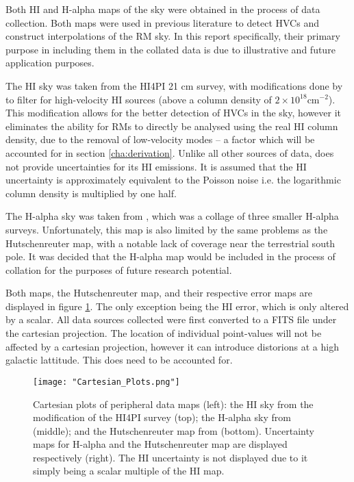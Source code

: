Both HI and H-alpha maps of the sky were obtained in the process of data collection. Both maps were used in previous literature to detect HVCs and construct interpolations of the RM sky. In this report specifically, their primary purpose in including them in the collated data is due to illustrative and future application purposes. 


The HI sky was taken from the HI4PI 21 cm survey, with modifications done by \cite{ID6} to filter for high-velocity HI sources (above a column density of $2\times 10^{18} \mathrm{cm}^{-2}$). This modification allows for the better detection of HVCs in the sky, however it eliminates the ability for RMs to directly be analysed using the real HI column density, due to the removal of low-velocity modes – a factor which will be accounted for in section \ref{cha:derivation}. Unlike all other sources of data, \cite{ID6} does not provide uncertainties for its HI emissions. It is assumed that the HI uncertainty is approximately equivalent to the Poisson noise i.e. the logarithmic column density is multiplied by one half.


The H-alpha sky was taken from \cite{ID43}, which was a collage of three smaller H-alpha surveys. Unfortunately, this map is also limited by the same problems as the Hutschenreuter map, with a notable lack of coverage near the terrestrial south pole. It was decided that the H-alpha map would be included in the process of collation for the purposes of future research potential.


Both maps, the Hutschenreuter map, and their respective error maps are displayed in figure \ref{fig:maps}. The only exception being the HI error, which is only altered by a scalar. All data sources collected were first converted to a FITS file under the cartesian projection. The location of individual point-values will not be affected by a cartesian projection, however it can introduce distorions at a high galactic lattitude. This does need to be accounted for.

\begin{figure}
    \texttt{[image: "Cartesian\_Plots.png"]}
    \centering
    \caption{Cartesian plots of peripheral data maps (left): the HI sky from the \cite{ID6} modification of the HI4PI survey (top); the H-alpha sky from \citep{ID43} (middle); and the Hutschenreuter map from \cite{ID44, ID45} (bottom). Uncertainty maps for H-alpha and the Hutschenreuter map are displayed respectively (right). The HI uncertainty is not displayed due to it simply being a scalar multiple of the HI map.}
    \label{fig:maps}
\end{figure}

